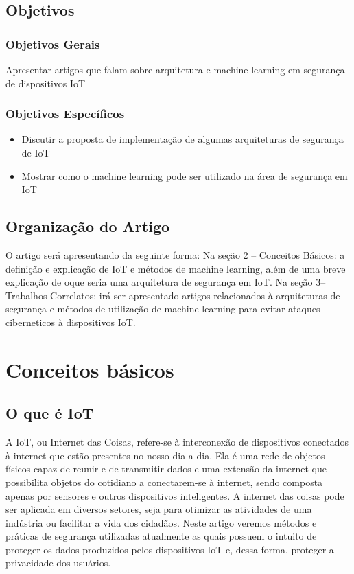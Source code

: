 \documentclass[article]{abntex2}
\begin{document}
\subsection{Objetivos}
\subsubsection{Objetivos Gerais}
Apresentar artigos que falam sobre arquitetura e machine learning em segurança de dispositivos IoT
\subsubsection{Objetivos Específicos}
\begin{itemize}
    \item Discutir a proposta de implementação de algumas arquiteturas de segurança de IoT
    \item Mostrar como o machine learning pode ser utilizado na área de segurança em IoT
\end{itemize}
\subsection{Organização do Artigo}
O artigo será apresentando da seguinte forma: Na seção 2 – Conceitos Básicos: a definição e explicação de IoT e métodos de machine learning, além de uma breve explicação de oque seria uma arquitetura de segurança em IoT. Na seção 3– Trabalhos Correlatos: irá ser apresentado artigos relacionados à arquiteturas de segurança e métodos de utilização de machine learning para evitar ataques ciberneticos à dispositivos IoT.
\section{Conceitos básicos}
\subsection{O que é IoT}
A IoT, ou Internet das Coisas, refere-se à interconexão de dispositivos conectados à internet que estão presentes no nosso dia-a-dia. Ela é uma rede de objetos físicos capaz de reunir e de transmitir dados e uma extensão da internet que possibilita objetos do cotidiano a conectarem-se à internet, sendo composta apenas por sensores e outros dispositivos inteligentes. A internet das coisas pode ser aplicada em diversos setores, seja para otimizar as atividades de uma indústria ou facilitar a vida dos cidadãos. Neste artigo veremos métodos e práticas de segurança utilizadas atualmente as quais possuem o intuito de proteger os dados produzidos pelos dispositivos IoT e, dessa forma, proteger a privacidade dos usuários.
\end{document}
